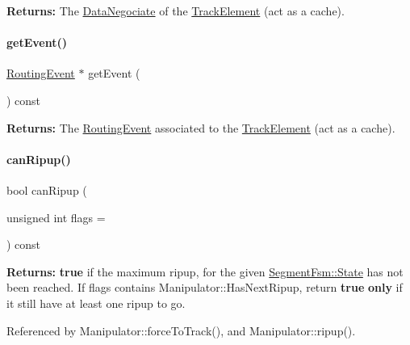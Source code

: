 {\bfseries Returns\+:} The \hyperlink{classKite_1_1DataNegociate}{Data\+Negociate} of the \hyperlink{classKite_1_1TrackElement}{Track\+Element} (act as a cache). \mbox{\label{classKite_1_1Manipulator_a513f39c546ef4be0d13787cdace4eadf}} 
\paragraph{\texorpdfstring{get\+Event()}{getEvent()}}
{\footnotesize\ttfamily \hyperlink{classKite_1_1RoutingEvent}{Routing\+Event} $\ast$ get\+Event (\begin{DoxyParamCaption}{ }\end{DoxyParamCaption}) const\hspace{0.3cm}{\ttfamily [inline]}}

{\bfseries Returns\+:} The \hyperlink{classKite_1_1RoutingEvent}{Routing\+Event} associated to the \hyperlink{classKite_1_1TrackElement}{Track\+Element} (act as a cache). \mbox{\label{classKite_1_1Manipulator_acae2506c976194aef762d27900c97b02}} 
\paragraph{\texorpdfstring{can\+Ripup()}{canRipup()}}
{\footnotesize\ttfamily bool can\+Ripup (\begin{DoxyParamCaption}\item[{unsigned int}]{flags = {} }\end{DoxyParamCaption}) const}

{\bfseries Returns\+:} {\bfseries true} if the maximum ripup, for the given \hyperlink{classKite_1_1SegmentFsm_a5d74787dedbc4e11c1ab15bf487e61f8}{Segment\+Fsm\+::\+State} has not been reached. If {\ttfamily flags} contains Manipulator\+::\+Has\+Next\+Ripup, return {\bfseries true} {\bfseries only} if it still have at least one ripup to go. 

Referenced by Manipulator\+::force\+To\+Track(), and Manipulator\+::ripup().

\mbox{\label{classKite_1_1Manipulator_a722e514efb92d4a05e4f4d9e1fe7f94b}} 
